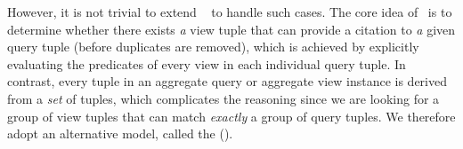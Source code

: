 \begin{example}
However, it is not trivial to extend \rba\ %
to handle such cases. %
The core idea of \rba\ is to determine whether there exists \textit{a} view tuple that can provide a citation to \textit{a} given query tuple (before duplicates are removed), which is achieved by explicitly evaluating the predicates of every view in each individual query tuple. %
In contrast, every tuple in an aggregate query or aggregate view instance is derived from a \textit{set} of tuples, which complicates the reasoning since we are looking for a group of view tuples that can match {\em exactly} a group of query tuples. 
We therefore adopt an alternative model, called the {\em \pbafull} ({\em \pba}).

\end{example}

